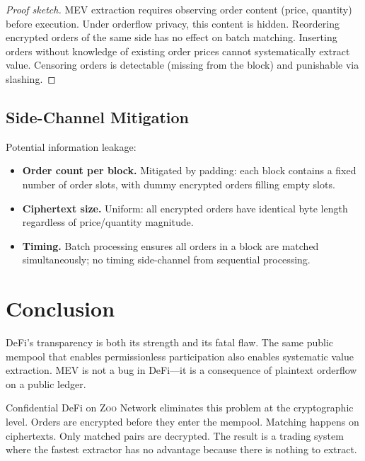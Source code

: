 \documentclass[11pt,letterpaper]{article}
\theoremstyle{definition}
\theoremstyle{remark}
\newcommand{\Zoo}{\textsc{Zoo}}
\newcommand{\MEV}{\textsc{MEV}}
\begin{document}
\begin{proof}[Proof sketch]
\MEV{} extraction requires observing order content (price, quantity) before execution. Under orderflow privacy, this content is hidden. Reordering encrypted orders of the same side has no effect on batch matching. Inserting orders without knowledge of existing order prices cannot systematically extract value. Censoring orders is detectable (missing from the block) and punishable via slashing.
\end{proof}

\subsection{Side-Channel Mitigation}

Potential information leakage:

\begin{itemize}
    \item \textbf{Order count per block.} Mitigated by padding: each block contains a fixed number of order slots, with dummy encrypted orders filling empty slots.
    \item \textbf{Ciphertext size.} Uniform: all encrypted orders have identical byte length regardless of price/quantity magnitude.
    \item \textbf{Timing.} Batch processing ensures all orders in a block are matched simultaneously; no timing side-channel from sequential processing.
\end{itemize}

\section{Conclusion}
\label{sec:conclusion}

DeFi's transparency is both its strength and its fatal flaw. The same public mempool that enables permissionless participation also enables systematic value extraction. \MEV{} is not a bug in DeFi---it is a consequence of plaintext orderflow on a public ledger.

Confidential DeFi on \Zoo{} Network eliminates this problem at the cryptographic level. Orders are encrypted before they enter the mempool. Matching happens on ciphertexts. Only matched pairs are decrypted. The result is a trading system where the fastest extractor has no advantage because there is nothing to extract.
\end{document}
